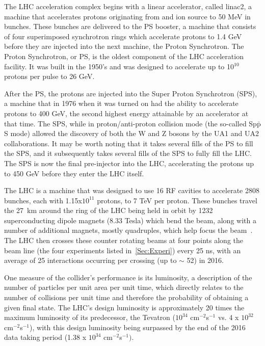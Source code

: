 The LHC acceleration complex begins with a linear accelerator, called linac2, a machine that accelerates protons originating from and ion source to 50 MeV in bunches.  
These bunches are delivered to the PS booster, a machine that consists of four superimposed synchrotron rings which accelerate protons to 1.4 GeV before they are injected into the next machine, the Proton Synchrotron.  
The Proton Synchrotron, or PS, is the oldest component of the LHC acceleration facility.  
It was built in the 1950's and was designed to accelerate up to 10$^{10}$ protons per pulse to 26 GeV.

After the PS, the protons are injected into the Super Proton Synchrotron (SPS), a machine that in 1976 when it was turned on had the ability to accelerate protons to 400 GeV, the second highest energy attainable by an accelerator at that time.  
The SPS, while in proton/anti-proton collision mode (the so-called Sp$\bar{\mathrm p}$S mode) allowed the discovery of both the W and Z bosons by the UA1 and UA2 collaborations.  
It may be worth noting that it takes several fills of the PS to fill the SPS, and it subsequently takes several fills of the SPS to fully fill the LHC.  
The SPS is now the final pre-injector into the LHC, accelerating the protons up to 450 GeV before they enter the LHC itself.  

The LHC is a machine that was designed to use 16 RF cavities to accelerate 2808 bunches, each with 1.15x$10^{11}$ protons, to 7 TeV per proton.  
These bunches travel the 27~km around the ring of the LHC being held in orbit by 1232 superconducting dipole magnets (8.33 Tesla) which bend the beam, along with a number of additional magnets, mostly quadruples, which help focus the beam~\cite{LHCTDR}.  
The LHC then crosses these counter rotating beams at four points along the beam line (the four experiments listed in~\ref{Sec:Experi}) every 25 ns, with an average of 25 interactions occurring per crossing (up to $\sim$ 52) in 2016. 

One measure of the collider's performance is its luminosity, a description of the number of particles per unit area per unit time, which directly relates to the number of collisions per unit time and therefore the probability of obtaining a given final state.  
The LHC's design luminosity is approximately 20 times the maximum luminosity of its predecessor, the Tevatron ($10^{34}$ cm$^{-2}$s$^{-1}$ vs. 4 x $10^{32}$ cm$^{-2}$s$^{-1}$), with this design luminosity being surpassed by the end of the 2016 data taking period (1.38 x $10^{34}$ cm$^{-2}$s$^{-1})$. 

